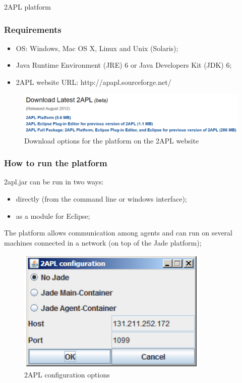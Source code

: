 \documentclass{beamer}
\begin{document}

\begin{frame}
\Huge{\centerline{2APL platform}}
\end{frame}

\begin{frame}
\frametitle{Requirements}
	\begin{itemize}
	\item OS: Windows, Mac OS X, Linux and Unix (Solaris);
    \item Java Runtime Environment (JRE) 6 or Java Developers Kit (JDK) 6;
    \item 2APL website URL: http://apapl.sourceforge.net/
	\end{itemize}
    
	\begin{figure}
	\includegraphics[width=0.9\linewidth]{images/2APLdownload.png}
    \caption{Download options for the platform on the 2APL website}
	\end{figure}
\end{frame}


\begin{frame}
\frametitle{How to run the platform}
2apl.jar can be run in two ways:
	\begin{itemize}
	\item directly (from the command line or windows interface);
    \item as a module for Eclipse;
	\end{itemize}

The platform allows communication among agents and can run on several machines connected in a network (on top of the Jade platform);

    \begin{figure}
	\includegraphics[width=0.4\linewidth]{images/2APLconf.png}
    \caption{2APL configuration options}
	\end{figure}
  
\end{frame}
\end{document}
